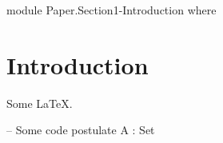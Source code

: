 \begin{code}[hide]
module Paper.Section1-Introduction where
\end{code}

\section{Introduction}

Some \LaTeX.

\begin{code}
-- Some code
postulate A : Set
\end{code}
